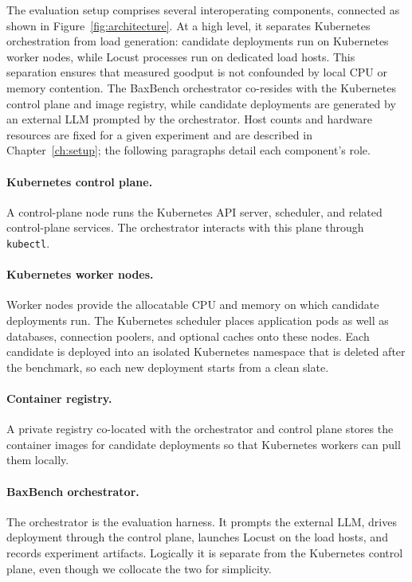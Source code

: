 The evaluation setup comprises several interoperating components, connected as
shown in Figure~\ref{fig:architecture}. At a high level, it separates
Kubernetes orchestration from load generation: candidate deployments run on
Kubernetes worker nodes, while Locust processes run on dedicated load hosts.
This separation ensures that measured goodput is not confounded by local CPU
or memory contention. The BaxBench orchestrator co-resides with the Kubernetes
control plane and image registry, while candidate deployments are generated by
an external LLM prompted by the orchestrator. Host counts and hardware
resources are fixed for a given experiment and are described in
Chapter~\ref{ch:setup}; the following paragraphs detail each component's role.

\paragraph{Kubernetes control plane.}
A control-plane node runs the Kubernetes API server, scheduler, and related
control-plane services. The orchestrator interacts with this plane through
\texttt{kubectl}.

\paragraph{Kubernetes worker nodes.}
Worker nodes provide the allocatable CPU and memory on which candidate
deployments run. The Kubernetes scheduler places application pods as well as
databases, connection poolers, and optional caches onto these nodes. Each
candidate is deployed into an isolated Kubernetes namespace that is deleted
after the benchmark, so each new deployment starts from a clean slate.

\paragraph{Container registry.}
A private registry co-located with the orchestrator and control plane stores
the container images for candidate deployments so that Kubernetes workers can
pull them locally.

\paragraph{BaxBench orchestrator.}
The orchestrator is the evaluation harness. It prompts the external LLM,
drives deployment through the control plane, launches Locust on the load
hosts, and records experiment artifacts. Logically it is separate from the
Kubernetes control plane, even though we collocate the two for simplicity.

